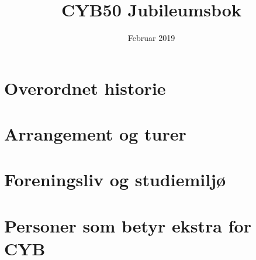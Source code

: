 \documentclass[hidelinks, openany, 12pt, a4paper]{book}
\title{CYB50 Jubileumsbok}
\author{}
\date{Februar 2019}
\begin{document}
\maketitle



\part{Overordnet historie}














\part{Arrangement og turer}









\part{Foreningsliv og studiemiljø}











\part{Personer som betyr ekstra for CYB}











\end{document}
